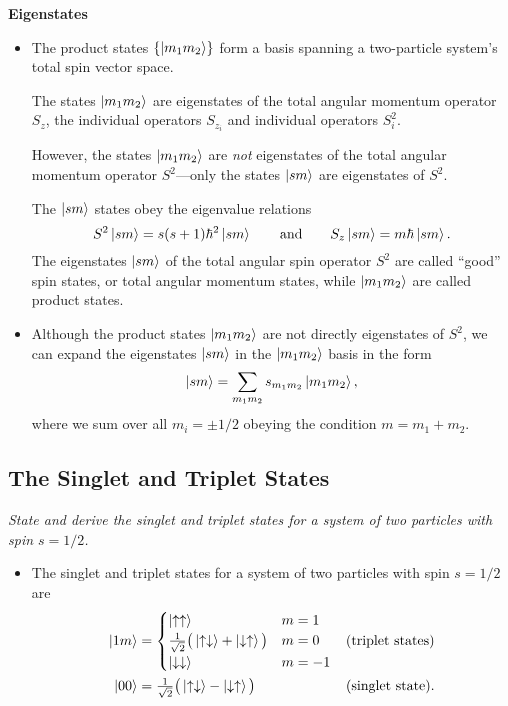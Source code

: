 \documentclass[11pt, a4paper]{article}
\newcommand{\ua}{\uparrow}  %
\newcommand{\da}{\downarrow}  %
\begin{document}
\textbf{Eigenstates}
\begin{itemize}
    \item The product states $ \{\ket{m_{1}m_{2}}\} $ form a basis spanning a two-particle system's total spin vector space.

    The states $ \ket{m_{1}m_{2}} $ are eigenstates of the total angular momentum operator $ S_{z} $, the individual operators $ S_{z_{i}} $ and individual operators $ S_{i}^{2} $. 

    However, the states $ \ket{m_{1}m_{2}} $ are \textit{not} eigenstates of the total angular momentum operator $ S^{2} $---only the states $ \ket{sm} $ are eigenstates of $ S^{2} $. 

    The $ \ket{sm} $ states obey the eigenvalue relations
    \begin{equation*}
        S^{2}\ket{sm} = s(s+1)\hbar^{2}\ket{sm} \qquad \text{and} \qquad S_{z}\ket{sm} = m\hbar \ket{sm}.
    \end{equation*}
    The eigenstates $ \ket{sm} $ of the total angular spin operator $ S^{2} $ are called ``good'' spin states, or total angular momentum states, while $ \ket{m_{1}m_{2}} $ are called product states.

    \item Although the product states $ \ket{m_{1}m_{2}} $ are not directly eigenstates of $ S^{2} $, we can expand the eigenstates $ \ket{sm} $ in the $ \ket{m_{1}m_{2}} $ basis in the form
    \begin{equation*}
        \ket{sm} = \sum_{m_{1}m_{2}} s_{m_{1}m_{2}}\ket{m_{1}m_{2}},
    \end{equation*}
    where we sum over all $ m_{i} = \pm 1/2 $ obeying the condition $ m = m_{1} + m_{2} $. 
    
\end{itemize}

\subsection{The Singlet and Triplet States}
\textit{State and derive the singlet and triplet states for a system of two particles with spin $ s = 1/2 $.}
\begin{itemize}
    \item The singlet and triplet states for a system of two particles with spin $ s = 1/2 $ are
    \begin{align*}
        \ket{1m} &= 
        \begin{cases}
            \ket{\ua\ua} & m = 1\\
            \tfrac{1}{\sqrt{2}} \big( \ket{\ua\da} + \ket{\da\ua} \big) & m = 0\\
            \ket{\da\da} & m = -1
        \end{cases} & \text{(triplet states)}\\
        \ket{00} &= \tfrac{1}{\sqrt{2}} \big( \ket{\ua\da} - \ket{\da \ua} \big) & \text{(singlet state)}.
    \end{align*}

\end{itemize}
\end{document}
